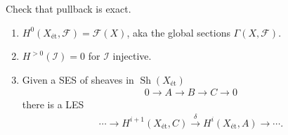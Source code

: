 \begin{exercise}[?]

Check that pullback is exact.

\end{exercise}

\begin{proposition}

\envlist

\begin{enumerate}
\def\labelenumi{\arabic{enumi}.}
\item
  \(H^0(X_\text{ét}, \mathcal{F}) = \mathcal{F}(X)\), aka the global
  sections \(\Gamma(X, \mathcal{F})\).
\item
  \(H^{>0}(\mathcal{I}) = 0\) for \(\mathcal{I}\) injective.
\item
  Given a SES of sheaves in \({\operatorname{Sh}}(X_\text{ét})\)
  \begin{align*}  
  0 \to A\to B \to C \to 0
  \end{align*}
  there is a LES
  \begin{align*}  
    \cdots \to H^{i+1}(X_\text{ét}, C) \xrightarrow{\delta} H^i(X_\text{ét}, A) \to \cdots
    .\end{align*}
\end{enumerate}

\end{proposition}

